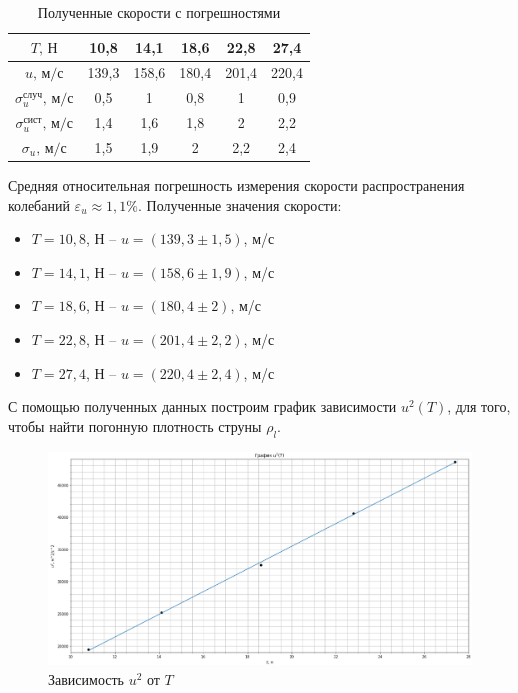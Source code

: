 \documentclass[a4paper,12pt]{article}
\begin{document}
	\begin{table}[H]
		\begin{center}
			\begin{tabular}{|c|c|c|c|c|c|}
				\hline
				$T\text{, Н}$ & 10,8&14,1& 18,6&22,8&27,4\\
				\hline
				$u\text{, м/с}$  & 139,3 & 158,6 & 180,4 & 201,4 & 220,4 \\ \hline
				$\sigma_{u}^{\text{случ}} \text{, м/с}$     & 0,5   & 1   & 0,8   & 1   & 0,9    \\ \hline
				$\sigma_{u}^{\text{сист}} \text{, м/с}$ & 1,4  & 1,6 & 1,8   & 2   & 2,2     \\ \hline
				$\sigma_{u} \text{, м/с}$ & 1,5   & 1,9   & 2   & 2,2   & 2,4    \\ \hline
			\end{tabular}
		\caption{Полученные скорости с погрешностями}
		\end{center}
	\end{table}

	Средняя относительная погрешность измерения скорости распространения колебаний $\varepsilon_u \approx 1,1\% $. Полученные значения скорости:
	
	\begin{itemize}
		\item $T = 10,8$, Н -- $u = (139,3 \pm 1,5)$, м/с
		\item  $T = 14,1$, Н -- $u = (158,6 \pm 1,9)$, м/с
		\item  $T = 18,6$, Н -- $u = (180,4 \pm 2)$, м/с
		\item  $T = 22,8$, Н -- $u = (201,4 \pm 2,2)$, м/с
		\item  $T = 27,4$, Н -- $u = (220,4 \pm 2,4)$, м/с
	\end{itemize}

	С помощью полученных данных построим график зависимости $u^2(T)$, для того, чтобы найти погонную плотность струны $ \rho_l $. 
	
	\begin{figure}[h!]
		\begin{center}
			\includegraphics[scale=0.53]{1.4.5 grapg2}
			\caption{Зависимость $ u^2 $ от $ T $}
			\label{1.4.5 grapg2}
		\end{center}
	\end{figure}
\end{document}
